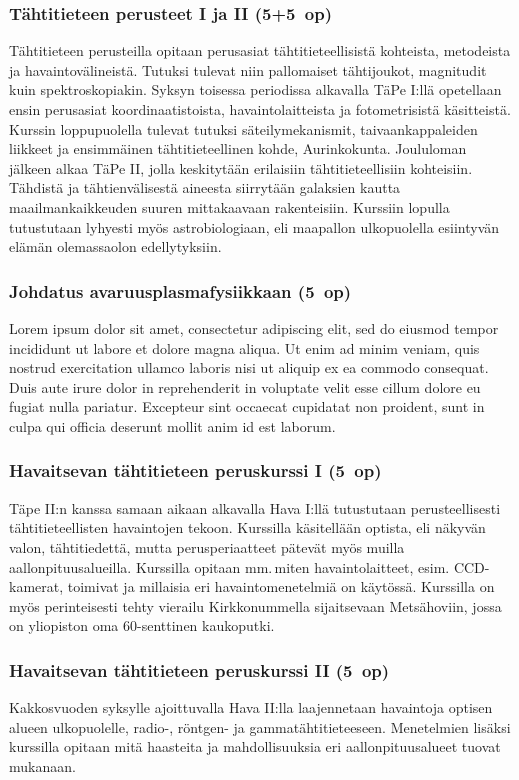 \documentclass[../ala_hataile.tex]{subfiles}
\begin{document}
\subsubsection*{Tähtitieteen perusteet I ja II (5+5~op)}
Tähtitieteen perusteilla opitaan perusasiat
tähtitieteellisistä kohteista, metodeista
ja havaintovälineistä. Tutuksi tulevat niin
pallomaiset tähtijoukot, magnitudit kuin
spektroskopiakin. Syksyn toisessa periodissa
alkavalla TäPe I:llä opetellaan ensin
perusasiat koordinaatistoista, havaintolaitteista
ja fotometrisistä käsitteistä. Kurssin
loppupuolella tulevat tutuksi säteilymekanismit,
taivaankappaleiden liikkeet ja ensimmäinen
tähtitieteellinen kohde, Aurinkokunta.
Joululoman jälkeen alkaa TäPe II, jolla
keskitytään erilaisiin tähtitieteellisiin kohteisiin.
Tähdistä ja tähtienvälisestä aineesta
siirrytään galaksien kautta maailmankaikkeuden
suuren mittakaavaan rakenteisiin.
Kurssiin lopulla tutustutaan lyhyesti myös
astrobiologiaan, eli maapallon ulkopuolella
esiintyvän elämän olemassaolon edellytyksiin.

\subsubsection*{Johdatus avaruusplasmafysiikkaan (5~op)}
Lorem ipsum dolor sit amet, consectetur adipiscing elit, sed do eiusmod tempor incididunt ut labore et dolore magna aliqua. Ut enim ad minim veniam, quis nostrud exercitation ullamco laboris nisi ut aliquip ex ea commodo consequat. Duis aute irure dolor in reprehenderit in voluptate velit esse cillum dolore eu fugiat nulla pariatur. Excepteur sint occaecat cupidatat non proident, sunt in culpa qui officia deserunt mollit anim id est laborum.

\subsubsection*{Havaitsevan tähtitieteen peruskurssi I (5~op)}
Täpe II:n kanssa samaan aikaan alkavalla
Hava I:llä tutustutaan perusteellisesti
tähtitieteellisten havaintojen tekoon. Kurssilla
käsitellään optista, eli näkyvän valon,
tähtitiedettä, mutta perusperiaatteet pätevät
myös muilla aallonpituusalueilla. Kurssilla
opitaan mm.\,miten havaintolaitteet, esim.
CCD-kamerat, toimivat ja millaisia eri havaintomenetelmiä
on käytössä. Kurssilla
on myös perinteisesti tehty vierailu Kirkkonummella
sijaitsevaan Metsähoviin, jossa
on yliopiston oma 60-senttinen kaukoputki.
\subsubsection*{Havaitsevan tähtitieteen peruskurssi II (5~op)}
Kakkosvuoden syksylle ajoittuvalla
Hava II:lla laajennetaan havaintoja optisen
alueen ulkopuolelle, radio-, röntgen- ja
gammatähtitieteeseen. Menetelmien lisäksi
kurssilla opitaan mitä haasteita ja mahdollisuuksia
eri aallonpituusalueet tuovat mukanaan.
\end{document}
